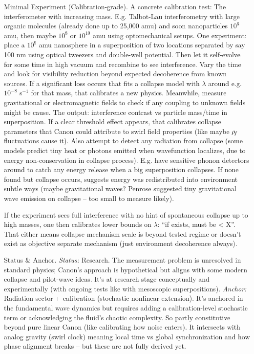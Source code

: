 \documentclass[11pt]{article}
\begin{document}
\begin{enumerate}
\end{enumerate}

Minimal Experiment (Calibration-grade). A concrete calibration test: The interferometer with increasing mass. E.g. Talbot-Lau interferometry with large organic molecules (already done up to 25,000 amu) and soon nanoparticles $10^6$ amu, then maybe $10^8$ or $10^{10}$ amu using optomechanical setups. One experiment: place a $10^{9}$ amu nanosphere in a superposition of two locations separated by say 100 nm using optical tweezers and double-well potential. Then let it self-evolve for some time in high vacuum and recombine to see interference. Vary the time and look for visibility reduction beyond expected decoherence from known sources. If a significant loss occurs that fits a collapse model with $\lambda$ around e.g. $10^{-8}$ s$^{-1}$ for that mass, that calibrates a new physics. Meanwhile, measure gravitational or electromagnetic fields to check if any coupling to unknown fields might be cause. The output: interference contrast vs particle mass/time in superposition. If a clear threshold effect appears, that calibrates collapse parameters that Canon could attribute to swirl field properties (like maybe $\rho_{\!f}$ fluctuations cause it). Also attempt to detect any radiation from collapse (some models predict tiny heat or photons emitted when wavefunction localizes, due to energy non-conservation in collapse process). E.g. have sensitive phonon detectors around to catch any energy release when a big superposition collapses. If none found but collapse occurs, suggests energy was redistributed into environment subtle ways (maybe gravitational waves? Penrose suggested tiny gravitational wave emission on collapse – too small to measure likely).

If the experiment sees full interference with no hint of spontaneous collapse up to high masses, one then calibrates lower bounds on $\lambda$: “if exists, must be < X”. That either means collapse mechanism scale is beyond tested regime or doesn't exist as objective separate mechanism (just environment decoherence always).


Status & Anchor. \textit{Status:} Research. The measurement problem is unresolved in standard physics; Canon’s approach is hypothetical but aligns with some modern collapse and pilot-wave ideas. It's at research stage conceptually and experimentally (with ongoing tests like with mesoscopic superpositions). \textit{Anchor:} Radiation sector + calibration (stochastic nonlinear extension). It’s anchored in the fundamental wave dynamics but requires adding a calibration-level stochastic term or acknowledging the fluid’s chaotic complexity. So partly constitutive beyond pure linear Canon (like calibrating how noise enters). It intersects with analog gravity (swirl clock) meaning local time vs global synchronization and how phase alignment breaks – but these are not fully derived yet.
\end{document}
